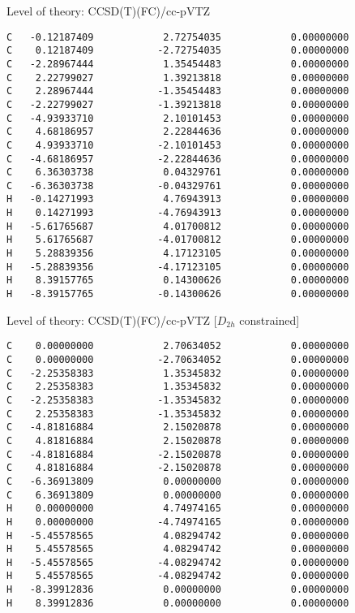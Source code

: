 \documentclass[journal=jctcce,manuscript=article,layout=traditional]{achemso}
\newcommand{\TZ}{cc-pVTZ}
\begin{document}
\begin{singlespace}
\noindent  Level of theory: CCSD(T)(FC)/{\TZ}
\begin{verbatim}
C   -0.12187409            2.72754035            0.00000000
C    0.12187409           -2.72754035            0.00000000
C   -2.28967444            1.35454483            0.00000000
C    2.22799027            1.39213818            0.00000000
C    2.28967444           -1.35454483            0.00000000
C   -2.22799027           -1.39213818            0.00000000
C   -4.93933710            2.10101453            0.00000000
C    4.68186957            2.22844636            0.00000000
C    4.93933710           -2.10101453            0.00000000
C   -4.68186957           -2.22844636            0.00000000
C    6.36303738            0.04329761            0.00000000
C   -6.36303738           -0.04329761            0.00000000
H   -0.14271993            4.76943913            0.00000000
H    0.14271993           -4.76943913            0.00000000
H   -5.61765687            4.01700812            0.00000000
H    5.61765687           -4.01700812            0.00000000
H    5.28839356            4.17123105            0.00000000
H   -5.28839356           -4.17123105            0.00000000
H    8.39157765            0.14300626            0.00000000
H   -8.39157765           -0.14300626            0.00000000
\end{verbatim}
\end{singlespace}

\begin{singlespace}
\noindent  Level of theory: CCSD(T)(FC)/{\TZ} [$D_{2h}$ constrained]
\begin{verbatim}
C    0.00000000            2.70634052            0.00000000
C    0.00000000           -2.70634052            0.00000000
C   -2.25358383            1.35345832            0.00000000
C    2.25358383            1.35345832            0.00000000
C   -2.25358383           -1.35345832            0.00000000
C    2.25358383           -1.35345832            0.00000000
C   -4.81816884            2.15020878            0.00000000
C    4.81816884            2.15020878            0.00000000
C   -4.81816884           -2.15020878            0.00000000
C    4.81816884           -2.15020878            0.00000000
C   -6.36913809            0.00000000            0.00000000
C    6.36913809            0.00000000            0.00000000
H    0.00000000            4.74974165            0.00000000
H    0.00000000           -4.74974165            0.00000000
H   -5.45578565            4.08294742            0.00000000
H    5.45578565            4.08294742            0.00000000
H   -5.45578565           -4.08294742            0.00000000
H    5.45578565           -4.08294742            0.00000000
H   -8.39912836            0.00000000            0.00000000
H    8.39912836            0.00000000            0.00000000
\end{verbatim}
\end{singlespace}
\end{document}
